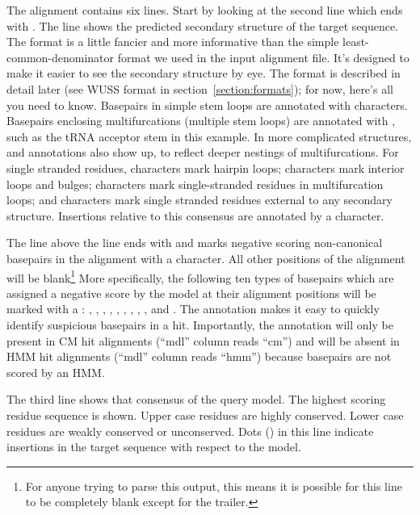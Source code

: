The alignment contains six lines. Start by looking at the second line
which ends with .  The line shows the predicted secondary
structure of the target sequence. The format is a little fancier and
more informative than the simple least-common-denominator format we
used in the input alignment file. It's designed to make it easier to
see the secondary structure by eye. The format is described in detail
later (see WUSS format in section~\ref{section:formats}); for now,
here's all you need to know. Basepairs in simple stem loops are
annotated with \otext{<>} characters. Basepairs enclosing
multifurcations (multiple stem loops) are annotated with \otext{()},
such as the tRNA acceptor stem in this example. In more complicated
structures, \otext{[]} and \otext{\{\}} annotations also show up, to
reflect deeper nestings of multifurcations. For single stranded
residues, \otext{\_} characters mark hairpin loops; \otext{-}
characters mark interior loops and bulges; \otext{,} characters mark
single-stranded residues in multifurcation loops; and \otext{:}
characters mark single stranded residues external to any secondary
structure. Insertions relative to this consensus are annotated by a
 character.

The line above the  line ends with  and marks
negative scoring non-canonical basepairs in the alignment with a
 character. All other positions of the alignment will be
blank\footnote{For anyone trying to parse this output, this means it
is possible for this line to be completely blank except for the
 trailer.} More specifically, the following ten types of
basepairs which are assigned a negative score by the model at their
alignment positions will be marked with a : ,
, , , , ,
, , , and . The 
annotation makes it easy to quickly identify suspicious basepairs in
a hit. Importantly, the  annotation will only be present in
CM hit alignments (``mdl'' column reads ``cm'') and will be absent in
HMM hit alignments (``mdl'' column reads ``hmm'') because basepairs
are not scored by an HMM.

The third line shows that consensus of the query model. The highest
scoring residue sequence is shown. Upper case residues are highly
conserved. Lower case residues are weakly conserved or unconserved.
Dots () in this line indicate insertions in the target
sequence with respect to the model.

